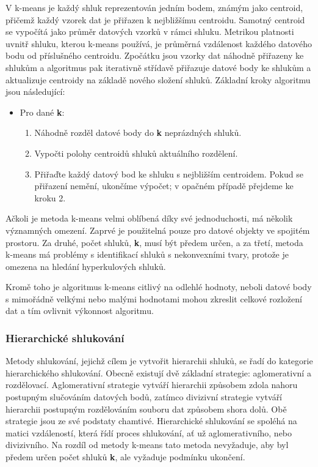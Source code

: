 V k-means je každý shluk reprezentován jedním bodem, známým jako centroid, přičemž každý vzorek dat je přiřazen k nejbližšímu centroidu. Samotný centroid se vypočítá jako průměr datových vzorků v rámci shluku. Metrikou platnosti uvnitř shluku, kterou k-means používá, je průměrná vzdálenost každého datového bodu od příslušného centroidu. Zpočátku jsou vzorky dat náhodně přiřazeny ke shlukům a algoritmus pak iterativně střídavě přiřazuje datové body ke shlukům a aktualizuje centroidy na základě nového složení shluků. Základní kroky algoritmu jsou následující:
\begin{itemize}
	\item Pro dané \textbf{k}:
	\begin{enumerate}
		\item Náhodně rozděl datové body do \textbf{k} neprázdných shluků. 
		\item Vypočti polohy centroidů shluků aktuálního rozdělení.
		\item Přiřaďte každý datový bod ke shluku s nejbližším centroidem. Pokud se přiřazení nemění, ukončíme výpočet; v opačném případě přejdeme ke kroku 2.
	\end{enumerate}
\end{itemize}

Ačkoli je metoda k-means velmi oblíbená díky své jednoduchosti, má několik významných omezení. Zaprvé je použitelná pouze pro datové objekty ve spojitém prostoru. Za druhé, počet shluků, \textbf{k}, musí být předem určen, a za třetí, metoda k-means má problémy s identifikací shluků s nekonvexními tvary, protože je omezena na hledání hyperkulových shluků.

\newpage

Kromě toho je algoritmus k-means citlivý na odlehlé hodnoty, neboli datové body s mimořádně velkými nebo malými hodnotami mohou zkreslit celkové rozložení dat a tím ovlivnit výkonnost algoritmu.

\subsubsection{Hierarchické shlukování}
Metody shlukování, jejichž cílem je vytvořit hierarchii shluků, se řadí do kategorie hierarchického shlukování\cite{Kaufman1990}. Obecně existují dvě základní strategie: aglomerativní a rozdělovací. Aglomerativní strategie vytváří hierarchii způsobem zdola nahoru postupným slučováním datových bodů, zatímco divizivní strategie vytváří hierarchii postupným rozdělováním souboru dat způsobem shora dolů. Obě strategie jsou ze své podstaty chamtivé. Hierarchické shlukování se spoléhá na matici vzdáleností, která řídí proces shlukování, ať už aglomerativního, nebo divizivního. Na rozdíl od metody k-means tato metoda nevyžaduje, aby byl předem určen počet shluků \textbf{k}, ale vyžaduje podmínku ukončení.

